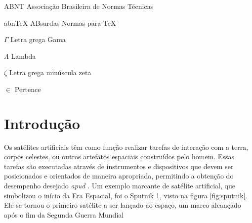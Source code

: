 \documentclass[
	12pt,				%
	openright,			%
	oneside,			%
	a4paper,			%
	english,			%
	brazil				%
	]{abntex2}
\begin{document}
\listoffigures*
\cleardoublepage

\listoftables*
\cleardoublepage


\begin{siglas}
  \item[ABNT] Associação Brasileira de Normas Técnicas
  \item[abnTeX] ABsurdas Normas para TeX
\end{siglas}

\begin{simbolos}
  \item[$ \Gamma $] Letra grega Gama
  \item[$ \Lambda $] Lambda
  \item[$ \zeta $] Letra grega minúscula zeta
  \item[$ \in $] Pertence
\end{simbolos}

\tableofcontents*
\cleardoublepage


\makeatletter
{}
\makeatother




\textual


\chapter[Introdução]{Introdução}

Os satélites artificiais têm como função realizar tarefas de interação com a terra, corpos celestes, ou outros artefatos espaciais construídos pelo homem. Essas tarefas são executadas através de instrumentos e dispositivos que devem ser posicionados e orientados de maneira apropriada, permitindo a obtenção do desempenho desejado \cite{shuster1993} \textit{apud} \cite{ferreira2008}. Um exemplo marcante de satélite artificial, que simbolizou o início da Era Espacial, foi o Sputnik 1, visto na figura \ref{fig:sputnik}. Ele se tornou o primeiro satélite a ser lançado ao espaço, um marco alcançado após o fim da Segunda Guerra Mundial
\end{document}
